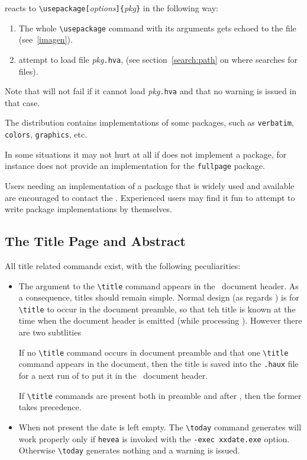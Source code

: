 \hevea{} reacts to
\verb+\usepackage[+\textit{options}\verb+]{+\textit{pkg}\verb+}+ in
the following way:
\begin{enumerate}
\item  The whole
\verb+\usepackage+ command with its arguments gets echoed to the
 file (see~\ref{imagen}).
\item \hevea{} attempt to load file \textit{pkg}\texttt{.hva},
(see section~\ref{search:path} on where \hevea{} searches for files).
\end{enumerate}
Note that \hevea{} will not fail if it cannot load
\textit{pkg}\texttt{.hva} and that no warning is issued in that case.

The \hevea{} distribution contains implementations of some packages,
such as \texttt{verbatim}, \texttt{colors}, \texttt{graphics}, etc.

In some situations it may not hurt at all if \hevea{} does not
implement a package, for instance \hevea{} does not provide an
implementation for the \texttt{fullpage} package.

Users needing an implementation of a package that is widely used and
available are encouraged to contact the
.
Experienced users may find it fun to attempt to write package
implementations by themselves.


\subsection{The Title Page and Abstract}
All title related commands exist, with the following peculiarities:
\begin{itemize}
  \item
  The argument to the \verb+\title+ command appears
  in the \html{}~document header. As a consequence, titles should
  remain simple. Normal design (as regards \hevea{}) is for
  \verb+\title+ to occur in the document preamble, so that teh title
  is known at the time when the document header is emitted (while
  processing \verb++). However there are two subtlities

  If no \verb+\title+
  command occurs in document preamble and that one \verb+\title+
  command appears in the document, then the title is saved into the
  \texttt{.haux} file for a next run of \hevea{} to put it in the
  \html{}~document header.

  If \verb+\title+ commands are present both in preamble and after
 \verb++, then the former takes precedence.

 \item When not present the date is left empty. The
 \verb+\today+ command generates will work properly
 only if \texttt{hevea} is invoked with the \verb+-exec xxdate.exe+
 option.  Otherwise \verb+\today+ generates nothing and a warning is
 issued.
\end{itemize}

